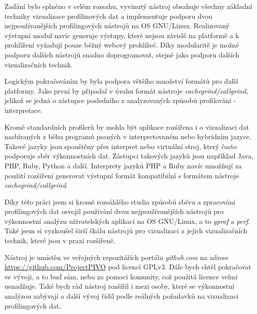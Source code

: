 \documentclass[czech,BP]{thesiskiv}
\begin{document}
Zadání bylo splněno v celém rozsahu, vyvinutý nástroj obsahuje všechny základní techniky vizualizace profilinových dat a implementuje podporu dvou nejpoužívanějších profilingových nástrojů na OS GNU/Linux. Realizovaný výstupní modul navíc generuje výstupy, které nejsou závislé na platformě a k prohlížení vyžadují pouze běžný webový prohlížeč. Díky modularitě je možné podporu dalších nástrojů snadno doprogramovat, stejně jako podporu dalších vizualizačních technik.

Logickým pokračováním by byla podpora většího množství formátů pro další platformy. Jako první by připadal v úvahu formát nástroje \emph{cachegrind/callgrind}, jelikož se jedná o zástupce posledního z analyzovaných způsobů profilování - interpretace.

Kromě standardních profilerů by mohla být aplikace rozšířena i o vizualizaci dat nasbíraných z běhu programů psaných v interpretovaném nebo hybridním jazyce. Takové jazyky jsou spouštěny přes interpret nebo virtuální stroj, který často podporuje sběr výkonnostních dat. Zástupci takových jazyků jsou například Java, PHP, Ruby, Python a další. Interprety jazyků PHP a Ruby navíc umožňují za použití rozšíření generovat výstupní formát kompatibilní s formátem nástroje \emph{cachegrind/callgrind}\cite{xdebugcache,rubycache}.

Díky této práci jsem si kromě rozsáhlého studia způsobů sběru a zpracování profilingových dat osvojil používání dvou nejpoužívanějších nástrojů pro výkonnostní analýzu uživatelských aplikací na OS GNU/Linux, a to \emph{gprof} a \emph{perf}. Také jsem si vyzkoušel širší škálu nástrojů pro vizualizaci a jejich vizualizačních technik, které jsou v praxi rozšířené. 

Nástroj je umístěn ve veřejných repozitářích portálu \emph{github.com} na adrese \url{https://github.com/ProjectPIVO} pod licencí GPLv3\cite{gplv3}. Dále bych chtěl pokračovat ve vývoji, a to buď sám, nebo za pomoci komunity, což použitá licence velmi usnadňuje. Také bych rád nástroj rozšířil i mezi osoby, které se výkonnostní analýzou zabývají a další vývoj řídil podle reálných požadavků na vizualizaci profilingových dat.




\newpage


{\raggedright\small

}






\end{document}
